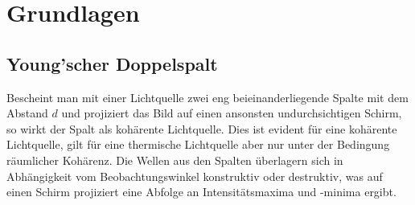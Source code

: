 \documentclass[ngerman]{scrartcl}
\begin{document}
\section[Grundlagen]{Grundlagen \cite{ref:angabe}}
\label{sec:grundlagen}

\subsection{Young'scher Doppelspalt}
\label{sec:grundlagen_youngscher_doppelspalt}

Bescheint man mit einer Lichtquelle zwei eng beieinanderliegende Spalte mit dem Abstand $d$ und projiziert das Bild auf einen ansonsten undurchsichtigen Schirm, so wirkt der Spalt als kohärente Lichtquelle. Dies ist evident für eine kohärente Lichtquelle, gilt für eine thermische Lichtquelle aber nur unter der Bedingung räumlicher Kohärenz. Die Wellen aus den Spalten überlagern sich in Abhängigkeit vom Beobachtungswinkel konstruktiv oder destruktiv, was auf einen Schirm projiziert eine Abfolge an Intensitätsmaxima und -minima ergibt.
\end{document}
